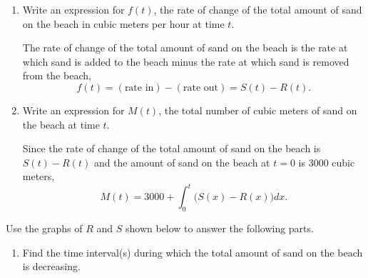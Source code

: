 \documentclass[main]{subfiles}
\begin{document}
\begin{enumerate}
\begin{enumerate}
    
    \item \begin{problem}[\vfill]
    Write an expression for $f(t)$, the rate of change
    of the total amount of sand on the beach in cubic meters per hour
    at time $t$.
    \end{problem}

    \begin{solution}
        The rate of change of the total amount of sand on the beach
        is the rate at which sand is added to the beach minus the 
        rate at which sand is removed from the beach,
        \[f(t)=\left(\text{rate in}\right) - 
        \left(\text{rate out}\right) = 
        \boxed{S(t)-R(t).}\]
    \end{solution}
        \pspace{16pt}
        
    \item \begin{problem}[\vfill\newpage]
        Write an expression for $M(t)$, the total number of
    cubic meters of sand on the beach at time $t$.
    \end{problem}

    \begin{solution}
        Since the rate of change of the total amount of sand
        on the beach is $S(t)-R(t)$ and the amount of sand on the
        beach at $t=0$ is $3000$ cubic meters, 
        \[M(t)=\boxed{3000+\int_0^t \bigl(S(x)-R(x)\bigr)dx.}\]
    \end{solution}
    \pspace{16pt}
    \end{enumerate}
    Use the graphs of $R$ and $S$ shown below to answer the following
    parts.
    
    \begin{center}
    \end{center}
    \probonly{\end{minipage}}
    \begin{enumerate}[resume,topsep=0pt]
    \item Find the time interval(s) during which the total amount of
    sand on the beach is decreasing. 
    

\end{enumerate}
\end{enumerate}
\end{document}
